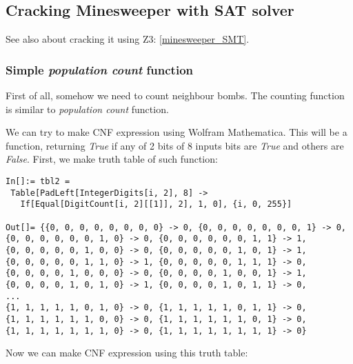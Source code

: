 \subsection{Cracking Minesweeper with SAT solver}
\label{minesweeper_SAT}

See also about cracking it using Z3: \ref{minesweeper_SMT}.

\subsubsection{Simple \textit{population count} function}

First of all, somehow we need to count neighbour bombs.
The counting function is similar to \textit{population count} function.

We can try to make \ac{CNF} expression using Wolfram Mathematica.
This will be a function, returning \textit{True}
if any of 2 bits of 8 inputs bits are \textit{True} and others are \textit{False}.
First, we make truth table of such function:

\begin{lstlisting}
In[]:= tbl2 = 
 Table[PadLeft[IntegerDigits[i, 2], 8] -> 
   If[Equal[DigitCount[i, 2][[1]], 2], 1, 0], {i, 0, 255}]

Out[]= {{0, 0, 0, 0, 0, 0, 0, 0} -> 0, {0, 0, 0, 0, 0, 0, 0, 1} -> 0, 
{0, 0, 0, 0, 0, 0, 1, 0} -> 0, {0, 0, 0, 0, 0, 0, 1, 1} -> 1, 
{0, 0, 0, 0, 0, 1, 0, 0} -> 0, {0, 0, 0, 0, 0, 1, 0, 1} -> 1, 
{0, 0, 0, 0, 0, 1, 1, 0} -> 1, {0, 0, 0, 0, 0, 1, 1, 1} -> 0, 
{0, 0, 0, 0, 1, 0, 0, 0} -> 0, {0, 0, 0, 0, 1, 0, 0, 1} -> 1, 
{0, 0, 0, 0, 1, 0, 1, 0} -> 1, {0, 0, 0, 0, 1, 0, 1, 1} -> 0, 
...
{1, 1, 1, 1, 1, 0, 1, 0} -> 0, {1, 1, 1, 1, 1, 0, 1, 1} -> 0, 
{1, 1, 1, 1, 1, 1, 0, 0} -> 0, {1, 1, 1, 1, 1, 1, 0, 1} -> 0, 
{1, 1, 1, 1, 1, 1, 1, 0} -> 0, {1, 1, 1, 1, 1, 1, 1, 1} -> 0}
\end{lstlisting}

Now we can make \ac{CNF} expression using this truth table:

